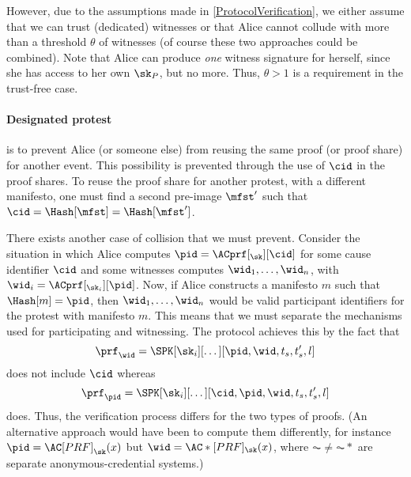However, due to the assumptions made in \cref{ProtocolVerification}, we either assume that we can trust (dedicated) witnesses or that Alice cannot collude with more than a threshold \(\theta\) of witnesses (of course these two approaches could be combined).
Note that Alice can produce \emph{one} witness signature for herself, since she 
has access to her own \(\sk_P\), but no more.
Thus, \(\theta > 1\) is a requirement in the trust-free case.

\paragraph{Designated protest}%
\label{analysis-designated}

 is to prevent Alice (or someone else) from reusing the same proof (or proof share) for another event.
This possibility is prevented through the use of \(\cid\) in the proof shares.
To reuse the proof share for another protest, with a different manifesto, one 
must find a second pre-image \(\mfst'\) such that \(\cid = \Hash[\mfst] = 
  \Hash[\mfst']\).

There exists another case of collision that we must prevent.
Consider the situation in which Alice computes \(\pid = \ACprf[_\sk][\cid]\) for some cause identifier \(\cid\) and some witnesses computes \(\wid_1, \dotsc, \wid_n\), with \(\wid_i = \ACprf[_{\sk_i}][\pid]\).
Now, if Alice constructs a manifesto \(m\) such that \(\Hash[m] = \pid\), then \(\wid_1, \dotsc, \wid_n\) would be valid participant identifiers for the protest with manifesto \(m\).
This means that we must separate the mechanisms used for participating and witnessing.
The protocol achieves this by the fact that \[
  \prf_{\wid} = \SPK[\sk_i][\dotsc][\pid, \wid, t_s, t_s', l]
\]
does not include \(\cid\) whereas \[
  \prf_{\pid} = \SPK[\sk_i][\dotsc][\cid, \pid, \wid, t_s, t_s', l]
\]
does.
Thus, the verification process differs for the two types of proofs.
(An alternative approach would have been to compute them differently, for 
instance \(\pid = \AC[PRF]_{\sk}(x)\) but \(\wid = \AC*[PRF]_{\sk}(x)\), where 
\(\AC \neq \AC*\) are separate anonymous-credential systems.)

%
%

